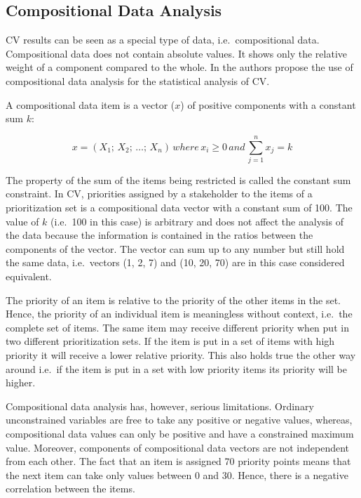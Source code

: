 
\subsection{\label{coda}Compositional Data Analysis}
CV results can be seen as a special type of data, i.e.\ compositional data.
Compositional data does not contain absolute values. It shows only
the relative weight of a component compared to the whole. In \cite{Chatzipetrou2010} the authors
propose the use of compositional data analysis for the statistical analysis of CV. 

A compositional data item is a vector ($x$) of positive components with a constant sum $k$:

\begin{equation}
x=(X_{1};\, X_{2};\,\ldots;\, X_{n})\, where\, x_{i}\geq0\, and\,\sum_{j=1}^{n}x_{j}=k
\label{eq:compositional-data}
\end{equation}

The property of the sum of the items being restricted is called the constant
sum constraint. In CV, priorities assigned by a stakeholder to the items of a prioritization
set is a compositional data vector with a constant sum of 100.
The value of $k$ (i.e.\ 100 in this case) is arbitrary and does not affect the analysis 
of the data because the information is contained in the ratios between the components of 
the vector. The vector can sum up to any number but still hold the same data, i.e.\ vectors 
(1, 2, 7) and (10, 20, 70) are in this case considered equivalent.

The priority of an item is relative to the priority of the other items
in the set. Hence, the priority of an individual item is meaningless without
context, i.e.\ the complete set of items. The same item may receive different priority
when put in two different prioritization sets. If the item is put
in a set of items with high priority it will receive a lower relative
priority. This also holds true the other way around i.e.\ if the item is put in a set
with low priority items its priority will be higher.

Compositional data analysis has, however, serious limitations.
Ordinary unconstrained variables are free to take any positive or negative
values, whereas, compositional data values can only be positive and
have a constrained maximum value. Moreover, components of compositional
data vectors are not independent from each other. The fact that an
item is assigned 70 priority points means that the next item can take
only values between 0 and 30. Hence, there is a negative correlation
between the items.

